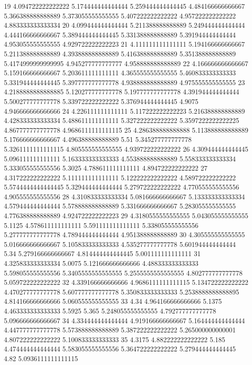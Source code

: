 19 4.094722222222222 5.174444444444444 5.259444444444445 4.484166666666667 5.366388888888889 5.373055555555555 5.407222222222222 4.957222222222222 4.883333333333334
20 4.099444444444444 5.211388888888889 5.249444444444444 4.444166666666667 5.389444444444445 5.331388888888889 5.391944444444444 4.953055555555555 4.929722222222223
21 4.111111111111111 5.194166666666667 5.211388888888889 4.393888888888889 5.416388888888889 5.351388888888889 5.4174999999999995 4.945277777777777 4.958888888888889
22 4.166666666666667 5.159166666666667 5.203611111111111 4.365555555555555 5.460833333333333 5.331944444444445 5.397777777777778 4.938888888888889 4.975555555555555
23 4.2188888888888885 5.120277777777778 5.197777777777778 4.391944444444444 5.500277777777778 5.339722222222222 5.376944444444445 4.9075 4.946666666666666
24 4.226111111111111 5.117222222222223 5.216388888888889 4.428333333333334 5.488611111111111 5.327222222222222 5.3597222222222225 4.867777777777778 4.9686111111111115
25 4.286388888888888 5.113888888888889 5.176666666666667 4.496388888888889 5.51 5.345277777777778 5.3261111111111115 4.805555555555555 4.939722222222222
26 4.309444444444445 5.096111111111111 5.163333333333333 4.553888888888889 5.558333333333334 5.333055555555556 5.3025 4.788611111111111 4.894722222222222
27 4.317222222222222 5.111111111111111 5.122222222222222 4.589722222222222 5.5744444444444445 5.329444444444444 5.279722222222222 4.770555555555556 4.905555555555556
28 4.310833333333334 5.081666666666667 5.133333333333334 4.579444444444444 5.578888888888889 5.331666666666667 5.283055555555555 4.776388888888889 4.924722222222223
29 4.3180555555555555 5.043055555555555 5.1125 4.578611111111111 5.591111111111111 5.338055555555556 5.277777777777778 4.789444444444444 4.951388888888889
30 4.305555555555555 5.016666666666667 5.105833333333333 4.535277777777778 5.601944444444444 5.34 5.279166666666667 4.814444444444445 5.001111111111111
31 4.325833333333334 5.0075 5.121666666666666 4.488333333333333 5.598055555555556 5.3405555555555555 5.2555555555555555 4.802777777777778 5.059722222222222
32 4.339166666666666 4.9686111111111115 5.134722222222222 4.470277777777778 5.607777777777778 5.350833333333333 5.2538888888888895 4.814166666666666 5.060555555555555
33 4.34 4.964166666666666 5.1375 4.463333333333333 5.5925 5.365 5.248055555555555 4.792777777777778 5.096666666666667
34 4.334444444444444 4.919166666666667 5.164444444444444 4.447777777777778 5.573888888888889 5.387222222222222 5.265000000000001 4.807222222222222 5.100833333333333
35 4.3175 4.882222222222222 5.185 4.474444444444444 5.583055555555556 5.364722222222222 5.279444444444445 4.82 5.0936111111111115
